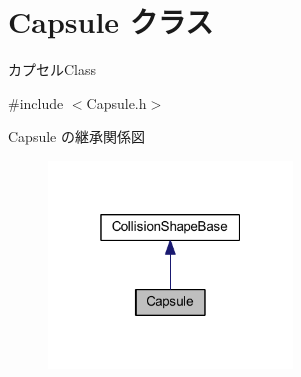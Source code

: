 \hypertarget{class_capsule}{}\section{Capsule クラス}
\label{class_capsule}


カプセル\+Class  




{\ttfamily \#include $<$Capsule.\+h$>$}



Capsule の継承関係図\nopagebreak
\begin{figure}[H]
\begin{center}
\leavevmode
\includegraphics[width=184pt]{class_capsule__inherit__graph}
\end{center}
\end{figure}
